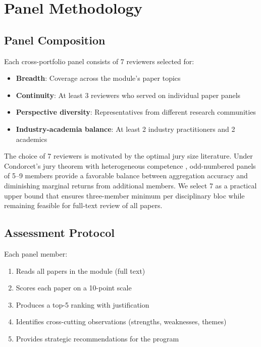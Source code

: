 \section{Panel Methodology}

\subsection{Panel Composition}

Each cross-portfolio panel consists of 7 reviewers selected for:
\begin{itemize}
    \item \textbf{Breadth}: Coverage across the module's paper topics
    \item \textbf{Continuity}: At least 3 reviewers who served on individual paper panels
    \item \textbf{Perspective diversity}: Representatives from different research communities
    \item \textbf{Industry-academia balance}: At least 2 industry practitioners and 2 academics
\end{itemize}

The choice of 7 reviewers is motivated by the optimal jury size literature. Under Condorcet's jury theorem with heterogeneous competence \cite{list2001epistemic}, odd-numbered panels of 5--9 members provide a favorable balance between aggregation accuracy and diminishing marginal returns from additional members. We select 7 as a practical upper bound that ensures three-member minimum per disciplinary bloc while remaining feasible for full-text review of all papers.

\subsection{Assessment Protocol}

Each panel member:
\begin{enumerate}
    \item Reads all papers in the module (full text)
    \item Scores each paper on a 10-point scale
    \item Produces a top-5 ranking with justification
    \item Identifies cross-cutting observations (strengths, weaknesses, themes)
    \item Provides strategic recommendations for the program
\end{enumerate}


